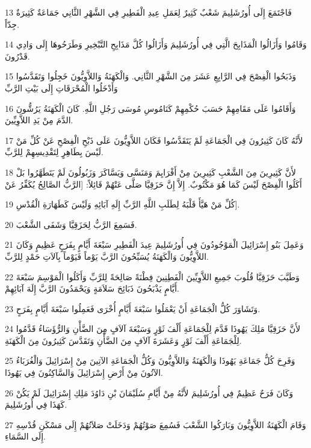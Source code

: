 \par 13 فَاجْتَمَعَ إِلَى أُورُشَلِيمَ شَعْبٌ كَثِيرٌ لِعَمَلِ عِيدِ الْفَطِيرِ فِي الشَّهْرِ الثَّانِي جَمَاعَةٌ كَثِيرَةٌ جِدّاً.
\par 14 وَقَامُوا وَأَزَالُوا الْمَذَابِحَ الَّتِي فِي أُورُشَلِيمَ وَأَزَالُوا كُلَّ مَذَابِحِ التَّبْخِيرِ وَطَرَحُوهَا إِلَى وَادِي قَدْرُونَ.
\par 15 وَذَبَحُوا الْفِصْحَ فِي الرَّابِعِ عَشَرَ مِنَ الشَّهْرِ الثَّانِي. وَالْكَهَنَةُ وَاللاَّوِيُّونَ خَجِلُوا وَتَقَدَّسُوا وَأَدْخَلُوا الْمُحْرَقَاتِ إِلَى بَيْتِ الرَّبِّ
\par 16 وَأَقَامُوا عَلَى مَقَامِهِمْ حَسَبَ حُكْمِهِمْ كَنَامُوسِ مُوسَى رَجُلِ اللَّهِ. كَانَ الْكَهَنَةُ يَرُشُّونَ الدَّمَ مِنْ يَدِ اللاَّوِيِّينَ.
\par 17 لأَنَّهُ كَانَ كَثِيرُونَ فِي الْجَمَاعَةِ لَمْ يَتَقَدَّسُوا فَكَانَ اللاَّوِيُّونَ عَلَى ذَبْحِ الْفِصْحِ عَنْ كُلِّ مَنْ لَيْسَ بِطَاهِرٍ لِتَقْدِيسِهِمْ لِلرَّبِّ.
\par 18 لأَنَّ كَثِيرِينَ مِنَ الشَّعْبِ كَثِيرِينَ مِنْ أَفْرَايِمَ وَمَنَسَّى وَيَسَّاكَرَ وَزَبُولُونَ لَمْ يَتَطَهَّرُوا بَلْ أَكَلُوا الْفِصْحَ لَيْسَ كَمَا هُوَ مَكْتُوبٌ. إِلاَّ إِنَّ حَزَقِيَّا صَلَّى عَنْهُمْ قَائِلاً: [الرَّبُّ الصَّالِحُ يُكَفِّرُ عَنْ
\par 19 كُلِّ مَنْ هَيَّأَ قَلْبَهُ لِطَلَبِ اللَّهِ الرَّبِّ إِلَهِ آبَائِهِ وَلَيْسَ كَطَهَارَةِ الْقُدْسِ].
\par 20 فَسَمِعَ الرَّبُّ لِحَزَقِيَّا وَشَفَى الشَّعْبَ.
\par 21 وَعَمِلَ بَنُو إِسْرَائِيلَ الْمَوْجُودُونَ فِي أُورُشَلِيمَ عِيدَ الْفَطِيرِ سَبْعَةَ أَيَّامٍ بِفَرَحٍ عَظِيمٍ وَكَانَ اللاَّوِيُّونَ وَالْكَهَنَةُ يُسَبِّحُونَ الرَّبَّ يَوْماً فَيَوْماً بِآلاَتِ حَمْدٍ لِلرَّبِّ.
\par 22 وَطَيَّبَ حَزَقِيَّا قُلُوبَ جَمِيعِ اللاَّوِيِّينَ الْفَطِنِينَ فِطْنَةً صَالِحَةً لِلرَّبِّ وَأَكَلُوا الْمَوْسِمَ سَبْعَةَ أَيَّامٍ يَذْبَحُونَ ذَبَائِحَ سَلاَمَةٍ وَيَحْمَدُونَ الرَّبَّ إِلَهَ آبَائِهِمْ.
\par 23 وَتَشَاوَرَ كُلُّ الْجَمَاعَةِ أَنْ يَعْمَلُوا سَبْعَةَ أَيَّامٍ أُخْرَى فَعَمِلُوا سَبْعَةَ أَيَّامٍ بِفَرَحٍ.
\par 24 لأَنَّ حَزَقِيَّا مَلِكَ يَهُوذَا قَدَّمَ لِلْجَمَاعَةِ أَلْفَ ثَوْرٍ وَسَبْعَةَ آلاَفٍ مِنَ الضَّأْنِ وَالرُّؤَسَاءُ قَدَّمُوا لِلْجَمَاعَةِ أَلْفَ ثَوْرٍ وَعَشَرَةَ آلاَفٍ مِنَ الضَّأْنِ وَتَقَدَّسَ كَثِيرُونَ مِنَ الْكَهَنَةِ.
\par 25 وَفَرِحَ كُلُّ جَمَاعَةِ يَهُوذَا وَالْكَهَنَةُ وَاللاَّوِيُّونَ وَكُلُّ الْجَمَاعَةِ الآتِينَ مِنْ إِسْرَائِيلَ وَالْغُرَبَاءُ الآتُونَ مِنْ أَرْضِ إِسْرَائِيلَ وَالسَّاكِنُونَ فِي يَهُوذَا.
\par 26 وَكَانَ فَرَحٌ عَظِيمٌ فِي أُورُشَلِيمَ لأَنَّهُ مِنْ أَيَّامِ سُلَيْمَانَ بْنِ دَاوُدَ مَلِكِ إِسْرَائِيلَ لَمْ يَكُنْ كَهَذَا فِي أُورُشَلِيمَ.
\par 27 وَقَامَ الْكَهَنَةُ اللاَّوِيُّونَ وَبَارَكُوا الشَّعْبَ فَسُمِعَ صَوْتُهُمْ وَدَخَلَتْ صَلاَتُهُمْ إِلَى مَسْكَنِ قُدْسِهِ إِلَى السَّمَاءِ.

